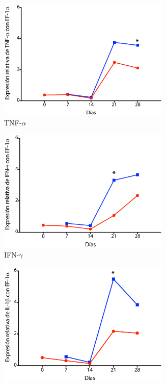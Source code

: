 \documentclass[12pt,letterpaper,oneside]{scrbook}
\begin{document}
\begin{figure}[h!]
    \begin{subfigure}{0.5\textwidth}
        \includegraphics[width=0.9\textwidth]{eps/qPCR/qtnfa}
        \caption{TNF-$\alpha$}
        \label{fig:qpcr:tnfa}
        \end{subfigure}
    \begin{subfigure}{0.5\textwidth}
        \includegraphics[width=0.9\textwidth]{eps/qPCR/qifng}
        \caption{IFN-$\gamma$}
        \label{fig:qpcr:ifng}
    \end{subfigure}
    \begin{subfigure}{0.5\textwidth}
        \includegraphics[width=0.9\textwidth]{eps/qPCR/qil1b}

\end{subfigure}
\end{figure}
\end{document}
